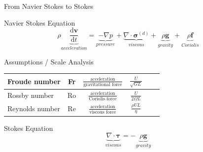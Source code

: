 \documentclass[hide notes,intlimits,unknownkeysallowed]{beamer}
\begin{document}
\begin{frame}{From Navier Stokes to Stokes}
  \begin{block}{Navier Stokes Equation}
  \begin{equation}
    \rho \underbrace{\frac{\textrm{d} {\bm{v}}}{\textrm{d} t}}_{acceleration} =  \underbrace{-\nabla p}_{pressure} +  \underbrace{\nabla \cdot \bm{\sigma}^{(d)}}_{viscous}  + \underbrace{\rho\bm{g}}_{gravity} + \underbrace{\rho\bm{f}}_{Coriolis}
  \end{equation}
  \end{block}
  \begin{block}{Assumptions / Scale Analysis}\vspace{0.5em}
\begin{tabular}{lccccc}
\hline
Froude number & Fr & $\frac{\text{acceleration}}{\text{gravitational force}}$ & $\frac{U}{\sqrt{GL}}$ \\[.25em]
\hline
Rossby number & Ro & $\frac{\text{acceleration}}{\text{Coriolis force}}$ & $\frac{U}{2 \Omega L}$   \\[.25em]
\hline
Reynolds number & Re & $\frac{\text{acceleration}}{\text{viscous force}}$ & $\frac{\rho U L}{\eta}$ \\[.25em]
\hline
\end{tabular}        
  \end{block}
  \begin{block}{Stokes Equation}
\begin{equation}
  \underbrace{\nabla \cdot \bm{\tau}}_{viscous} = - \underbrace{\rho\bm{g}}_{gravity}
\end{equation}
  \end{block}
\end{frame}
\end{document}
